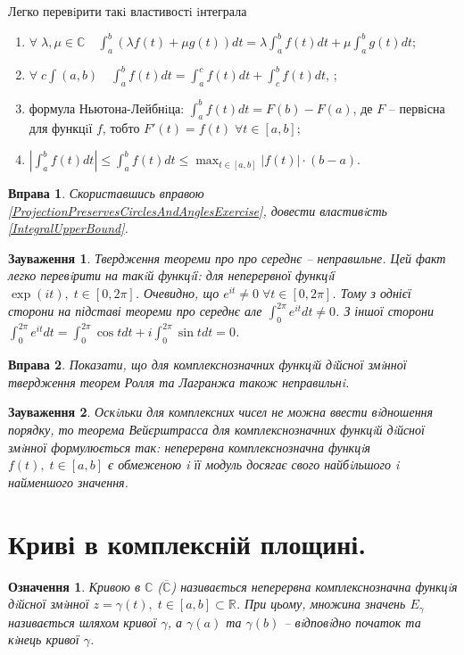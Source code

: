 \documentclass[10pt]{report} %
\let\oldforall\forall
\renewcommand{\forall}{\oldforall\;}
\newtheorem{definition}{Означення}[section]
\newtheorem{exercise}{Вправа}
\newtheorem{remark}{Зауваження}
\begin{document}
Легко перевiрити такi властивостi iнтеграла
\begin{enumerate}
\item{$\forall \lambda,\mu\in\mathbb{C}\quad \int_a^b\left(\lambda f(t)+\mu g(t)\right)dt=\lambda\int_a^bf(t)dt+\mu\int_a^bg(t)dt$;}
\item{$\forall c\int(a,b)\quad \int_a^bf(t)dt=\int_a^c f(t)dt+\int_c^b f(t)dt$, ;}
\item{формула Ньютона-Лейбнiца: $\int_a^b f(t)dt=F(b)-F(a)$, де $F$ -- первiсна для функцiї $f$, тобто $F'(t)=f(t)\;\oldforall t\in[a,b]$;}
\item{\label{IntegralUpperBound}$\left|\int_a^b f(t)dt\right|\leq \int_a^b f(t)dt\leq\displaystyle\max_{t\in [a,b]}|f(t)|\cdot(b-a)$.}
\end{enumerate}
\begin{exercise}Скориставшись вправою \ref{ProjectionPreservesCirclesAndAnglesExercise}, довести властивiсть \ref{IntegralUpperBound}.\end{exercise}
\begin{remark}
Твердження теореми про про середнє – неправильне. Цей факт легко перевiрити на такiй функцiї: для неперервної функцiї $\exp(it),\;t\in[0,2\pi]$.
Очевидно, що $e^{it}\neq 0\;\oldforall t\in [0,2\pi]$. Тому з однієї сторони на підставі теореми про середнє але $\int_0^{2\pi}e^{it}dt\neq 0$.
З іншої сторони $\int_0^{2\pi}e^{it}dt=\int_0^{2\pi}\cos tdt+i\int_0^{2\pi}\sin tdt=0$.
\end{remark}
\begin{exercise}
Показати, що для комплекснозначних функцiй дiйсної змiнної твердження теорем Ролля та Лагранжа також неправильнi.
\end{exercise}
\begin{remark}
Оскiльки для комплексних чисел не можна ввести вiдношення порядку, то теорема Вейєрштрасса для комплекснозначних функцiй дiйсної змiнної
формулюється так: неперервна комплекснозначна функцiя $f(t),\;t \in [a, b]$ є обмеженою i її модуль досягає свого найбiльшого i найменшого значення.
\end{remark}
\section{Криві в комплексній площині.}
\begin{definition}
Кривою в $\mathbb{C}$ ($\overline{\mathbb{C}}$) називається неперервна комплекснозначна функцiя
дiйсної змiнної $z = \gamma(t),\;t\in [a, b]\subset \mathbb{R}$. При цьому, множина значень $E_{\gamma}$ називається
шляхом кривої $\gamma$, а $\gamma(a)$ та $\gamma(b)$ -- вiдповiдно початок та кiнець кривої $\gamma$.
\end{definition}
\end{document}
